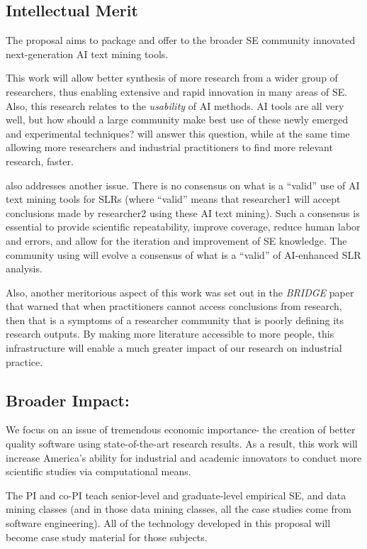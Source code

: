\newcommand{\SHAW}{{\em {\sffamily BRIDGE}}}
\subsection{Intellectual Merit}
The proposal aims to package and offer to the broader SE community
innovated next-generation AI text mining tools. 

This work will allow better synthesis  of more research from a wider group of researchers, thus enabling extensive and rapid innovation in many areas of SE.
Also, this research relates to the {\em usability} of AI methods.
AI tools are all very well, but how should a large community make best use of these newly emerged and experimental techniques? {\IT} will answer this question, while at the same time allowing
more researchers and industrial practitioners to find more
relevant research, faster. 

{\IT}  also addresses another   issue.
There is no consensus on what is a ``valid'' use of AI text mining tools  for SLRs (where ``valid''  means  that  researcher1  will  accept     conclusions  made  by  researcher2  using  these AI text mining).   Such  a  consensus  is 
  essential  to  provide  scientific  repeatability,  improve  coverage, reduce human labor and errors, and allow for the iteration and improvement of SE knowledge.
  The community using {\IT} will   evolve a consensus of what is a ``valid'' of AI-enhanced SLR analysis.
  

Also, another meritorious  aspect of this work was set out in the {\SHAW} paper that warned that 
when practitioners cannot access conclusions from research, then
that is a   symptoms of a researcher community that is poorly defining its research outputs. By making more literature accessible to more people,
this infrastructure will enable a much greater impact of our research on
industrial practice.
\vspace{8pt}

 

\subsection{Broader Impact:} 
We focus on an issue of tremendous economic importance- the creation of better quality software using state-of-the-art research results.  
As a result, this work will increase America's ability for industrial and academic innovators to conduct more scientific studies via computational means.

The  PI and co-PI teach senior-level  and  graduate-level  empirical  SE,  and  data  mining  classes  (and  in  those  data mining  classes,  all  the  case  studies  come  from  software  engineering).   
All  of  the  technology  developed in this proposal will become case study material for those subjects.  

